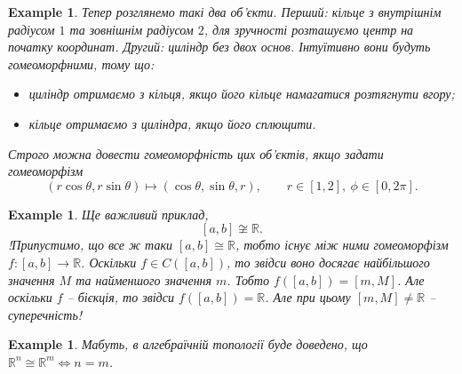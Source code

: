 \documentclass[a4paper, 10pt]{article}
\theoremstyle{theoremdd}
\newtheorem{example}[theorem]{Example}
\begin{document}
\begin{example}
Тепер розглянемо такі два об'єкти. Перший: кільце з внутрішнім радіусом $1$ та зовнішнім радіусом $2$, для зручності розташуємо центр на початку координат. Другий: циліндр без двох основ. Інтуїтивно вони будуть гомеоморфними, тому що:
\begin{itemize}[nosep,wide=0pt]
\item циліндр отримаємо з кільця, якщо його кільце намагатися розтягнути вгору;
\item кільце отримаємо з циліндра, якщо його сплющити.
\end{itemize}
\begin{figure}[H]
\centering
{}
\qquad
{}
\end{figure}
\noindent
Строго можна довести гомеоморфність цих об'єктів, якщо задати гомеоморфізм
\[
(r \cos \theta, r \sin \theta) \mapsto (\cos \theta, \sin \theta,r), \qquad r \in [1,2],\ \phi \in [0,2\pi].
\]
\end{example}

\begin{example}
Ще важливий приклад, 
\[
[a,b] \not\cong \mathbb{R}.
\]
!Припустимо, що все ж таки $[a,b] \cong \mathbb{R}$, тобто існує між ними гомеоморфізм $f \colon [a,b] \to \mathbb{R}$. Оскільки $f \in C([a,b])$, то звідси воно досягає найбільшого значення $M$ та найменшого значення $m$. Тобто $f([a,b]) = [m,M]$. Але оскільки $f$ -- бієкція, то звідси $f([a,b]) = \mathbb{R}$. Але при цьому $[m,M] \neq \mathbb{R}$ -- суперечність!
\end{example}

\begin{example}
Мабуть, в алгебраїчній топології буде доведено, що $\mathbb{R}^n \cong \mathbb{R}^m \iff n = m$.
\end{example}
\end{document}

